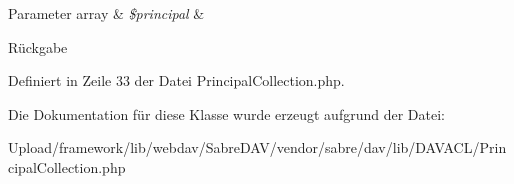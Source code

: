 \begin{DoxyParams}[1]{Parameter}
array & {\em \$principal} & \\
\hline
\end{DoxyParams}
\begin{DoxyReturn}{Rückgabe}

\end{DoxyReturn}


Definiert in Zeile 33 der Datei Principal\+Collection.\+php.



Die Dokumentation für diese Klasse wurde erzeugt aufgrund der Datei\+:\begin{DoxyCompactItemize}
\item 
Upload/framework/lib/webdav/\+Sabre\+D\+A\+V/vendor/sabre/dav/lib/\+D\+A\+V\+A\+C\+L/Principal\+Collection.\+php\end{DoxyCompactItemize}
